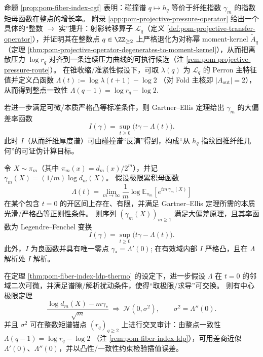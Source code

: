 \begin{remark}\label{rem:pom-fiber-index-ldp}
命题 \ref{prop:pom-fiber-index-cgf} 表明：碰撞谱 \(q\mapsto h_q\) 等价于纤维指数 \(\gamma_m\) 的指数矩母函数在整点的增长率。
附录 \ref{app:pom-projective-pressure-operator} 给出一个具体的“整数 \(\to\) 实”提升：射影转移算子 \(\mathcal{L}_q\)（定义 \ref{def:pom-projective-transfer-operator}），并证明其在整数点 \(q\in\ZZ_{\ge 2}\) 上严格退化为对称幂 moment-kernel \(\widetilde A_q\)（定理 \ref{thm:pom-projective-operator-degenerates-to-moment-kernel}），从而把离散压力 \(\log r_q\) 对齐到一条连续压力曲线的可执行候选（注 \ref{rem:pom-projective-pressure-route}）。
在锥收缩/准紧性假设下，可取 \(\lambda(q)\) 为 \(\mathcal{L}_q\) 的 Perron 主特征值并定义凸函数
\(
\Lambda(t):=\log\lambda(t+1)-\log 2
\)
（对 Fold 主核即 \(|A_{\mathrm{out}}|=2\)），从而得到整点一致性
\(
\Lambda(q-1)=\log r_q-\log 2
\).

若进一步满足可微/本质严格凸等标准条件，则 Gartner--Ellis 定理给出 \(\gamma_m\) 的大偏差率函数
\[
I(\gamma)=\sup_{t\ge 0}\bigl(t\gamma-\Lambda(t)\bigr).
\]
此时 \(I\)（从而纤维厚度谱）可由碰撞谱“反演”得到，构成“从 \(h_q\) 指纹回推纤维几何”的可证伪计算目标。
\end{remark}

\begin{theorem}\label{thm:pom-fiber-index-ldp-thermo}
令 \(X\sim\pi_m\)（其中 \(\pi_m(x)=d_m(x)/2^m\)），并记
\(
\gamma_m(X)=(1/m)\log d_m(X)
\)。
假设极限累积母函数
\[
\Lambda(t)=\lim_{m\to\infty}\frac{1}{m}\log \mathbb{E}_{\pi_m}\!\left[e^{t m\,\gamma_m(X)}\right]
\]
在某个包含 \(t=0\) 的开区间上存在、有限，并满足 Gartner--Ellis 定理所需的本质光滑/严格凸等正则性条件。
则序列 \((\gamma_m(X))_{m\ge 1}\) 满足大偏差原理，且其率函数为 Legendre--Fenchel 变换
\[
I(\gamma)=\sup_{t\ge 0}\bigl(t\gamma-\Lambda(t)\bigr).
\]
此外，\(I\) 为良函数并具有唯一零点
\(
\gamma_\ast=\Lambda'(0)
\);
在有效域内部 \(I\) 严格凸，且在 \(\Lambda\) 解析处 \(I\) 解析。
\end{theorem}

\begin{theorem}[中心极限定理与二阶常数的可审计性]\label{thm:pom-fiber-index-clt-thermo}
在定理 \ref{thm:pom-fiber-index-ldp-thermo} 的设定下，进一步假设 \(\Lambda\) 在 \(t=0\) 的邻域二次可微，并满足谱隙/解析扰动条件，使得“取极限/求导”可交换。
则有中心极限定理
\[
\frac{\log d_m(X)-m\gamma_\ast}{\sqrt m}\ \Longrightarrow\ \mathcal N(0,\sigma^2),
\qquad
\sigma^2=\Lambda''(0).
\]
并且 \(\sigma^2\) 可在整数矩谱锚点 \((r_q)_{q\ge 2}\) 上进行交叉审计：由整点一致性
\(
\Lambda(q-1)=\log r_q-\log 2
\)
（注 \ref{rem:pom-fiber-index-ldp}），可用差商近似 \(\Lambda'(0)\)、\(\Lambda''(0)\)，并以凸性/一致性约束检验插值误差。
\end{theorem}

